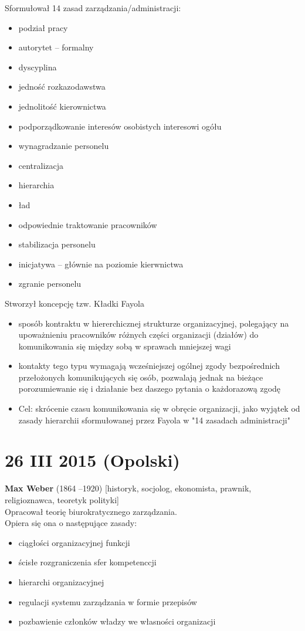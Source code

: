 \documentclass[a4paper,10pt]{report}
\begin{document}
Sformułował 14 zasad zarządzania/administracji:
\begin{itemize}
	\item podział pracy
	\item autorytet -- formalny
	\item dyscyplina
	\item jedność rozkazodawstwa
	\item jednolitość kierownictwa
	\item podporządkowanie interesów osobistych interesowi ogółu
	\item wynagradzanie personelu
	\item centralizacja
	\item hierarchia
	\item ład
	\item odpowiednie traktowanie pracowników
	\item stabilizacja personelu
	\item inicjatywa -- głównie na poziomie kierwnictwa
	\item zgranie personelu	
\end{itemize}

Stworzył koncepcję tzw. Kładki Fayola
\begin{itemize}
	\item sposób kontraktu w hiererchicznej strukturze organizacyjnej, polegający na upoważnieniu pracowników różnych części organizacji (działów) do komunikowania się między sobą w sprawach mniejszej wagi
	\item kontakty tego typu wymagają wcześniejszej ogólnej zgody bezpośrednich przełożonych komunikujących się osób, pozwalają jednak na bieżące porozumiewanie się i działanie bez daszego pytania o każdorazową zgodę
	\item Cel: skrócenie czasu komunikowania się w obręcie organizacji, jako wyjątek od zasady hierarchii sformułowanej przez Fayola w "14 zasadach administracji"
\end{itemize}

\section{26 III 2015 (Opolski)}

\textbf{Max Weber} (1864 --1920) [historyk, socjolog, ekonomista, prawnik, religioznawca, teoretyk polityki]\\
Opracował teorię biurokratycznego zarządzania.\\
Opiera się ona o następujące zasady:
\begin{itemize}
	\item ciągłości organizacyjnej funkcji
	\item ścisłe rozgraniczenia sfer kompetenccji
	\item hierarchi organizacyjnej
	\item regulacji systemu zarządzania w formie przepisów
	\item pozbawienie członków władzy we własności organizacji
\end{itemize}
\end{document}
